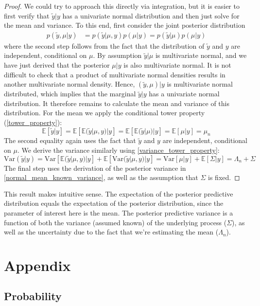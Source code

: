 \documentclass[12pt]{article}
\newcommand{\E}{\mathbb{E}}
\newcommand{\Var}{\mathrm{Var}}
\begin{document}
\begin{proof}
We could try to approach this directly via integration, but it is easier to first verify that $\tilde{y}|y$ has a univariate normal distribution and then just solve for the mean and variance. 
To this end, first consider the joint posterior distribution
\begin{align*}
p(\tilde{y}, \mu|y) &= p(\tilde{y}|\mu, y)p(\mu|y) = p(\tilde{y}|\mu)p(\mu|y)
\end{align*}
where the second step follows from the fact that the distribution of $\tilde{y}$ and $y$ are independent, conditional on $\mu$. By assumption $\tilde{y}|\mu$ is multivariate normal, and we have
just derived that the posterior $\mu|y$ is also multivariate normal. It is not difficult to check that a product of multivariate normal densities results in another multivariate normal density. Hence, 
$(\tilde{y}, \mu)|y$ is multivariate normal distributed, which implies that the marginal $\tilde{y}|y$ has a univariate normal distribution. It therefore remains to calculate the mean and variance of this
distribution. For the mean we apply the conditional tower property (\ref{tower_property}): 
\[\E[\tilde{y}|y] = \E[\E(\tilde{y}|\mu, y)|y] = \E[\E(\tilde{y}|\mu)|y] = \E[\mu|y] = \mu_n\]
The second equality again uses the fact that $\tilde{y}$ and $y$ are independent, conditional on $\mu$. We derive the variance similarly using \ref{variance_tower_property}: 
\[\Var(\tilde{y}|y) = \Var[\E(\tilde{y}|\mu, y)|y] + \E[\Var(\tilde{y}|\mu, y)|y] = \Var[\mu|y] + \E[\Sigma|y] = \Lambda_n + \Sigma\]
The final step uses the derivation of the posterior variance in \ref{normal_mean_known_variance}, as well as the assumption that $\Sigma$ is fixed. 
\end{proof}
This result makes intuitive sense. The expectation of the posterior predictive distribution equals the expectation of the posterior distribution, since the parameter of interest here is the mean. 
The posterior predictive variance is a function of both the variance (assumed known) of the underlying process ($\Sigma$), as well as the uncertainty due to the fact that we're estimating the 
mean ($\Lambda_n$). 

\section{Appendix}

\subsection{Probability}
\end{document}
